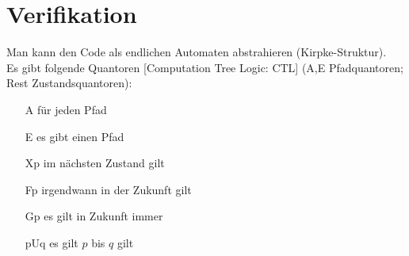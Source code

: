 \section{Verifikation}
Man kann den Code als endlichen Automaten abstrahieren (Kirpke-Struktur).\\
Es gibt folgende Quantoren [Computation Tree Logic: CTL] (A,E Pfadquantoren; Rest Zustandsquantoren):
\begin{itemize}
	\item[A] für jeden Pfad
	\item[E] es gibt einen Pfad
	\item[Xp] im nächsten Zustand gilt
	\item[Fp] irgendwann in der Zukunft gilt
	\item[Gp] es gilt in Zukunft immer
	\item[pUq] es gilt $p$ bis $q$ gilt
\end{itemize}

